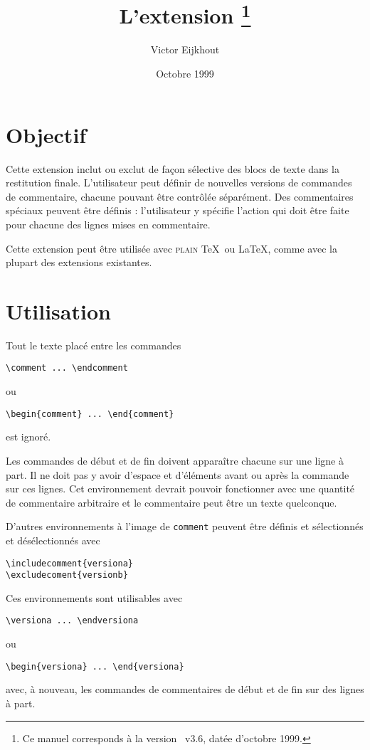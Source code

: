 \documentclass[parskip=false, DIV=8, headings=normal, pagesize=auto]{scrartcl}
\title{L'extension \pkg{comment}\thanks{Ce manuel corresponds à la version \pkg{comment}~v3.6, datée d'octobre 1999.}}
\author{Victor Eijkhout\\\mail{victor@eijkhout.net}}
\date{Octobre 1999}
\newcommand*{\env}[1]{\texttt{#1}}
\begin{document}
\maketitle

\section{Objectif}

Cette extension inclut ou exclut de façon sélective des blocs de texte dans la
restitution finale. L'utilisateur peut définir de nouvelles versions de 
commandes de commentaire, chacune pouvant être contrôlée séparément.
Des commentaires spéciaux peuvent être définis : l'utilisateur y spécifie
l'action qui doit être faite pour chacune des lignes mises en commentaire.

Cette extension peut être utilisée avec \textsc{plain} \TeX\ ou \LaTeX, comme
avec la plupart des extensions existantes.

\section{Utilisation}

Tout le texte placé entre les commandes
%
\begin{verbatim}
\comment ... \endcomment
\end{verbatim}
%
ou
%
\begin{verbatim}
\begin{comment} ... \end{comment}
\end{verbatim}
%
est ignoré. 

Les commandes de début et de fin doivent apparaître chacune sur une ligne à
part. Il ne doit pas y avoir d'espace et d'éléments avant ou après la commande
sur ces lignes. 
Cet environnement devrait pouvoir fonctionner avec une quantité de commentaire
arbitraire et le commentaire peut être un texte quelconque.

D'autres environnements à l'image de \env{comment} peuvent être définis et
sélectionnés et désélectionnés avec 
%
\begin{verbatim}
\includecomment{versiona}
\excludecoment{versionb}
\end{verbatim}
%
Ces environnements sont utilisables avec
%
\begin{verbatim}
\versiona ... \endversiona
\end{verbatim}
%
ou
%
\begin{verbatim}
\begin{versiona} ... \end{versiona}
\end{verbatim}
%
avec, à nouveau, les commandes de commentaires de début et de fin sur des
lignes à part.
\end{document}
